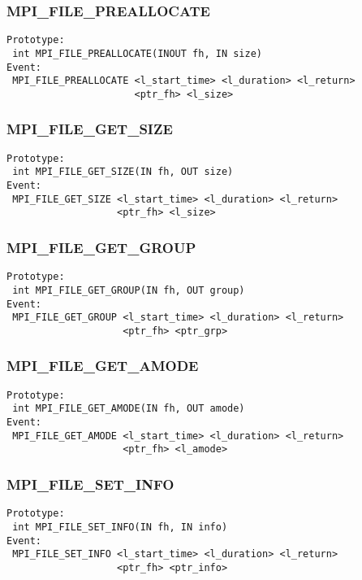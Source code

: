 \documentclass[9pt]{article}
\begin{document}
\subsubsection{MPI\_FILE\_PREALLOCATE}
\label{sec:MPIFILEPREALLOCATE}
\begin{verbatim}
Prototype: 
 int MPI_FILE_PREALLOCATE(INOUT fh, IN size)
Event: 
 MPI_FILE_PREALLOCATE <l_start_time> <l_duration> <l_return>
                      <ptr_fh> <l_size>
\end{verbatim}

\subsubsection{MPI\_FILE\_GET\_SIZE}
\label{sec:MPIFILEGETSIZE}
\begin{verbatim}
Prototype:
 int MPI_FILE_GET_SIZE(IN fh, OUT size)
Event:
 MPI_FILE_GET_SIZE <l_start_time> <l_duration> <l_return>
                   <ptr_fh> <l_size>
\end{verbatim}

\subsubsection{MPI\_FILE\_GET\_GROUP}
\label{sec:MPIFILEGETGROUP}
\begin{verbatim}
Prototype:
 int MPI_FILE_GET_GROUP(IN fh, OUT group)
Event:
 MPI_FILE_GET_GROUP <l_start_time> <l_duration> <l_return>
                    <ptr_fh> <ptr_grp>
\end{verbatim}

\subsubsection{MPI\_FILE\_GET\_AMODE}
\label{sec:MPIFILEGETAMODE}
\begin{verbatim}
Prototype:
 int MPI_FILE_GET_AMODE(IN fh, OUT amode)
Event:
 MPI_FILE_GET_AMODE <l_start_time> <l_duration> <l_return>
                    <ptr_fh> <l_amode>
\end{verbatim}

\subsubsection{MPI\_FILE\_SET\_INFO}
\label{sec:MPIFILESETINFO}
\begin{verbatim}
Prototype:
 int MPI_FILE_SET_INFO(IN fh, IN info)
Event:
 MPI_FILE_SET_INFO <l_start_time> <l_duration> <l_return>
                   <ptr_fh> <ptr_info>
\end{verbatim}
\end{document}
